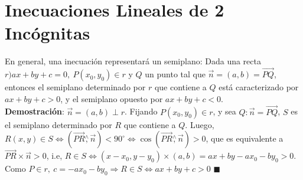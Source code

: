 \documentclass[11pt,a4paper]{article}
\newcommand*{\QEDA}{\null\nobreak\hfill\ensuremath{\blacksquare}}
\begin{document}
\section{Inecuaciones Lineales de 2 Inc\'ognitas}
En general, una inecuaci\'on representar\'a un semiplano: Dada una recta $r) ax+by+c=0,\ P(x_0,y_0) \in r$ y $Q$ un punto tal que $\overrightarrow{n}=(a,b)=\overrightarrow{PQ}$, entonces el semiplano determinado por $r$ que contiene a $Q$ est\'a caracterizado por $ax+by+c>0$, y el semiplano opuesto por $ax+by+c<0$.\\
\textbf{Demostraci\'on}: $\overrightarrow{n} = (a,b) \perp r$. Fijando $P(x_0,y_0)\in r$, y sea $Q : \overrightarrow{n} = \overrightarrow{PQ}$, $S$ es el semiplano determinado por $R$ que contiene a $Q$. Luego, $R(x,y) \in S \iff (\overrightarrow{PR}\overset{\wedge}{,}\overrightarrow{n}) < 90^\circ \iff \cos (\overrightarrow{PR}\overset{\wedge}{,}\overrightarrow{n}) > 0$, que es equivalente a $\overrightarrow{PR} \times \overrightarrow{n} > 0$, i.e, $R \in S \iff (x-x_0,y-y_0) \times (a,b) = ax+by-ax_0-by_0 > 0$. Como $P \in r,\ c = -ax_0-by_0 \Rightarrow R \in S \iff ax+by+c>0$ \QEDA
\end{document}
